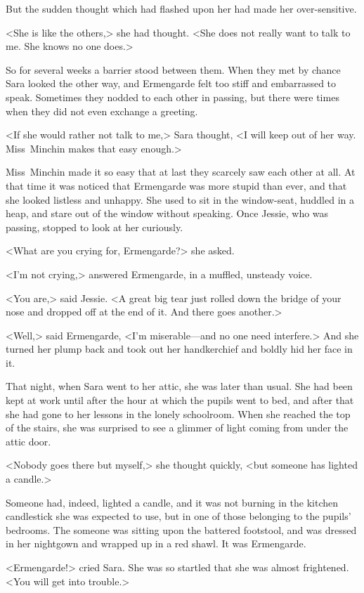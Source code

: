 But the sudden thought which had flashed upon her had made her over-sensitive.

<She is like the others,> she had thought. <She does not really want to talk to me. She knows no one does.>

So for several weeks a barrier stood between them. When they met by chance Sara looked the other way, and Ermengarde felt too stiff and embarrassed to speak. Sometimes they nodded to each other in passing, but there were times when they did not even exchange a greeting.

<If she would rather not talk to me,> Sara thought, <I will keep out of her way. Miss~Minchin makes that easy enough.>

Miss~Minchin made it so easy that at last they scarcely saw each other at all. At that time it was noticed that Ermengarde was more stupid than ever, and that she looked listless and unhappy. She used to sit in the window-seat, huddled in a heap, and stare out of the window without speaking. Once Jessie, who was passing, stopped to look at her curiously.

<What are you crying for, Ermengarde?> she asked.

<I'm not crying,> answered Ermengarde, in a muffled, unsteady voice.

<You are,> said Jessie. <A great big tear just rolled down the bridge of your nose and dropped off at the end of it. And there goes another.>

<Well,> said Ermengarde, <I'm miserable—and no one need interfere.> And she turned her plump back and took out her handkerchief and boldly hid her face in it.

That night, when Sara went to her attic, she was later than usual. She had been kept at work until after the hour at which the pupils went to bed, and after that she had gone to her lessons in the lonely schoolroom. When she reached the top of the stairs, she was surprised to see a glimmer of light coming from under the attic door.

<Nobody goes there but myself,> she thought quickly, <but someone has lighted a candle.>

Someone had, indeed, lighted a candle, and it was not burning in the kitchen candlestick she was expected to use, but in one of those belonging to the pupils' bedrooms. The someone was sitting upon the battered footstool, and was dressed in her nightgown and wrapped up in a red shawl. It was Ermengarde.

<Ermengarde!> cried Sara. She was so startled that she was almost frightened. <You will get into trouble.>

